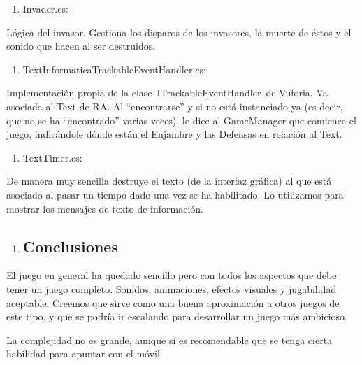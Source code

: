 \begin{enumerate}
\def\labelenumi{\arabic{enumi}.}
\setcounter{enumi}{4}
\itemsep1pt\parskip0pt
\item
  Invader.cs:
\end{enumerate}

Lógica del invasor. Gestiona los disparos de los invasores, la muerte de
éstos y el sonido que hacen al ser destruidos.

\begin{enumerate}
\def\labelenumi{\arabic{enumi}.}
\setcounter{enumi}{5}
\itemsep1pt\parskip0pt
\item
  TextInformaticaTrackableEventHandler.cs:
\end{enumerate}

Implementación propia de la clase~ITrackableEventHandler~de Vuforia. Va
asociada al Text de RA. Al ``encontrarse'' y si no está instanciado ya
(es decir, que no se ha ``encontrado'' varias veces), le dice al
GameManager que comience el juego, indicándole dónde están el Enjambre y
las Defensas en relación al Text.

\begin{enumerate}
\def\labelenumi{\arabic{enumi}.}
\setcounter{enumi}{6}
\itemsep1pt\parskip0pt
\item
  TextTimer.cs:
\end{enumerate}

De manera muy sencilla destruye el texto (de la interfaz gráfica) al que
está asociado al pasar un tiempo dado una vez se ha habilitado. Lo
utilizamos para mostrar los mensajes de texto de información.

\begin{enumerate}
\def\labelenumi{\arabic{enumi}.}
\setcounter{enumi}{3}
\item
  \subsection{Conclusiones}\label{h.49x2ik5}
\end{enumerate}

El juego en general ha quedado sencillo pero con todos los aspectos que
debe tener un juego completo. Sonidos, animaciones, efectos visuales y
jugabilidad aceptable. Creemos que sirve como una buena aproximación a
otros juegos de este tipo, y que se podría ir escalando para desarrollar
un juego más ambicioso.

La complejidad no es grande, aunque sí es recomendable que se tenga
cierta habilidad para apuntar con el móvil.

